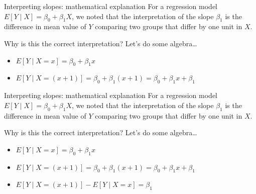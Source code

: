 \documentclass[10pt,t]{beamer}
\begin{document}
\begin{frame}{Interpreting slopes: mathematical explanation}
For a regression model $E[Y \mid X] = \beta_0 + \beta_1 X$, we noted that the interpretation of the slope $\beta_1$ is the difference in mean value of $Y$ comparing two groups that differ by one unit in $X$. 

\vspace{0.3cm}

Why is this the correct interpretation? Let's do some algebra\dots

\vspace{0.3cm}

\begin{itemize}
	\item $E[Y \mid X = x] = \beta_0 + \beta_1 x$
	\item $E[Y \mid X = (x + 1)] = \beta_0 + \beta_1 (x + 1) = \beta_0 + \beta_1 x + \beta_1$
\end{itemize}

\end{frame}

\begin{frame}{Interpreting slopes: mathematical explanation}
For a regression model $E[Y \mid X] = \beta_0 + \beta_1 X$, we noted that the interpretation of the slope $\beta_1$ is the difference in mean value of $Y$ comparing two groups that differ by one unit in $X$. 

\vspace{0.3cm}

Why is this the correct interpretation? Let's do some algebra\dots

\vspace{0.3cm}

\begin{itemize}
	\item $E[Y \mid X = x] = \beta_0 + \beta_1 x$
	\item $E[Y \mid X = (x + 1)] = \beta_0 + \beta_1 (x + 1) = \beta_0 + \beta_1 x + \beta_1$
	\item $E[Y \mid X = (x + 1)] - E[Y \mid X = x] = \beta_1$
\end{itemize}

\end{frame}
\end{document}
